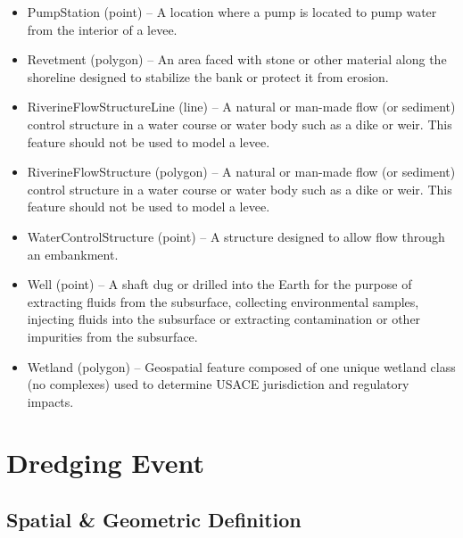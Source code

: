 \documentclass[
  letterpaper,
  DIV=11,
  numbers=noendperiod]{scrreprt}
\begin{document}
\begin{itemize}
  dike) used to control the flow of water into and out of the low flow
  area.
\item
  PumpStation (point) -- A location where a pump is located to pump
  water from the interior of a levee.
\item
  Revetment (polygon) -- An area faced with stone or other material
  along the shoreline designed to stabilize the bank or protect it from
  erosion.
\item
  RiverineFlowStructureLine (line) -- A natural or man-made flow (or
  sediment) control structure in a water course or water body such as a
  dike or weir. This feature should not be used to model a levee.
\item
  RiverineFlowStructure (polygon) -- A natural or man-made flow (or
  sediment) control structure in a water course or water body such as a
  dike or weir. This feature should not be used to model a levee.
\item
  WaterControlStructure (point) -- A structure designed to allow flow
  through an embankment.
\item
  Well (point) -- A shaft dug or drilled into the Earth for the purpose
  of extracting fluids from the subsurface, collecting environmental
  samples, injecting fluids into the subsurface or extracting
  contamination or other impurities from the subsurface.
\item
  Wetland (polygon) -- Geospatial feature composed of one unique wetland
  class (no complexes) used to determine USACE jurisdiction and
  regulatory impacts.
\end{itemize}

\chapter{Dredging Event}\label{dredging-event}

\section{Spatial \& Geometric
Definition}\label{spatial-geometric-definition}
\end{document}
